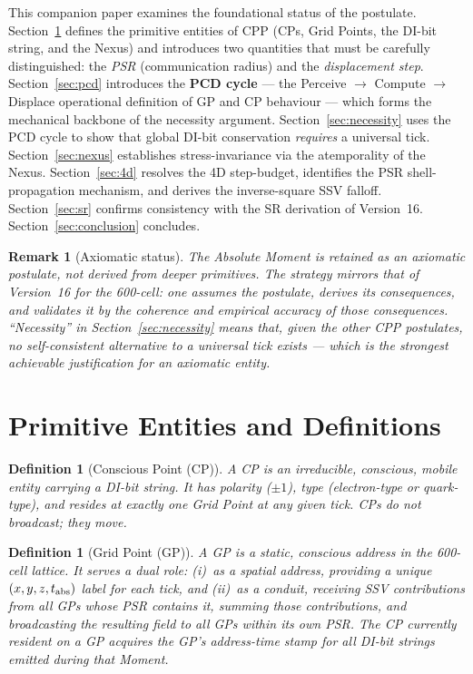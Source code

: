 \documentclass[12pt]{article}
\newtheorem{definition}[theorem]{Definition}
\newtheorem{remark}[theorem]{Remark}
\begin{document}
This companion paper examines the foundational status of the postulate.
Section~\ref{sec:entities} defines the primitive entities of CPP (CPs, Grid
Points, the DI-bit string, and the Nexus) and introduces two quantities that
must be carefully distinguished: the \emph{PSR} (communication radius) and
the \emph{displacement step}.  Section~\ref{sec:pcd} introduces the
\textbf{PCD cycle} --- the Perceive $\to$ Compute $\to$ Displace operational
definition of GP and CP behaviour --- which forms the mechanical backbone of
the necessity argument.  Section~\ref{sec:necessity} uses the PCD cycle to
show that global DI-bit conservation \emph{requires} a universal tick.
Section~\ref{sec:nexus} establishes stress-invariance via the atemporality of
the Nexus.  Section~\ref{sec:4d} resolves the 4D step-budget, identifies the
PSR shell-propagation mechanism, and derives the inverse-square SSV falloff.
Section~\ref{sec:sr} confirms consistency with the SR derivation of
Version~16.  Section~\ref{sec:conclusion} concludes.

\begin{remark}[Axiomatic status]
The Absolute Moment is retained as an \emph{axiomatic postulate}, not derived
from deeper primitives.  The strategy mirrors that of Version~16 for the
600-cell: one assumes the postulate, derives its consequences, and validates it
by the coherence and empirical accuracy of those consequences.  ``Necessity''
in Section~\ref{sec:necessity} means that, given the other CPP postulates,
\emph{no self-consistent alternative} to a universal tick exists --- which
is the strongest achievable justification for an axiomatic entity.
\end{remark}

\section{Primitive Entities and Definitions}
\label{sec:entities}

\begin{definition}[Conscious Point (CP)]
A CP is an irreducible, conscious, mobile entity carrying a DI-bit string.
It has polarity ($\pm 1$), type (electron-type or quark-type), and resides at
exactly one Grid Point at any given tick.  CPs do not broadcast; they move.
\end{definition}

\begin{definition}[Grid Point (GP)]
A GP is a static, conscious address in the 600-cell lattice.  It serves a
\emph{dual role}: (i)~as a \emph{spatial address}, providing a unique
$(x,y,z,t_{\rm abs})$ label for each tick, and (ii)~as a \emph{conduit},
receiving SSV contributions from all GPs whose PSR contains it, summing those
contributions, and broadcasting the resulting field to all GPs within its own
PSR.  The CP currently resident on a GP acquires the GP's address-time stamp
for all DI-bit strings emitted during that Moment.
\end{definition}
\end{document}
